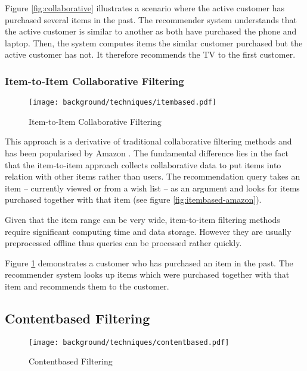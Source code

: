 Figure \ref{fig:collaborative} illustrates a scenario where the active customer has purchased several items in the past. The recommender system understands that the active customer is similar to another as both have purchased the phone and laptop. Then, the system computes items the similar customer purchased but the active customer has not. It therefore recommends the TV to the first customer.

\subsubsection{Item-to-Item Collaborative Filtering}
\label{bg-tech-itembased}

\begin{figure}[ht]
    \texttt{[image: background/techniques/itembased.pdf]}
    \caption{Item-to-Item Collaborative Filtering}
    \label{fig:itembased}
\end{figure}

This approach is a derivative of traditional collaborative filtering methods and has been popularised by Amazon \cite{linden03}. The fundamental difference lies in the fact that the item-to-item approach collects collaborative data to put items into relation with other items rather than users. The recommendation query takes an item -- currently viewed or from a wish list -- as an argument and looks for items purchased together with that item (see figure \ref{fig:itembased-amazon}).

Given that the item range can be very wide, item-to-item filtering methods require significant computing time and data storage. However they are usually preprocessed offline thus queries can be processed rather quickly.

Figure \ref{fig:itembased} demonstrates a customer who has purchased an item in the past. The recommender system looks up items which were purchased together with that item and recommends them to the customer.

\subsection{Contentbased Filtering}

\begin{figure}[ht]
    \texttt{[image: background/techniques/contentbased.pdf]}
    \caption{Contentbased Filtering}
    \label{fig:contentbased}
\end{figure}

